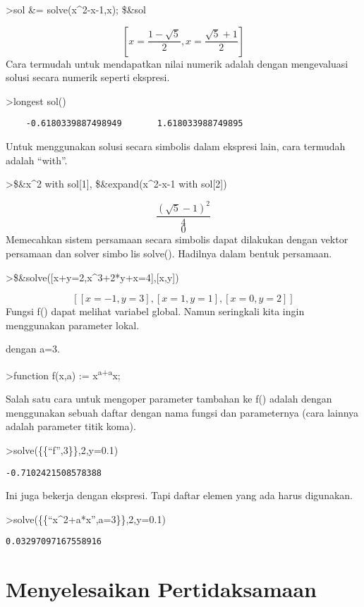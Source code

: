 \documentclass[
]{book}
\begin{document}
\textgreater sol \&= solve(x\^{}2-x-1,x); \$\&sol

\[\left[ x=\frac{1-\sqrt{5}}{2} , x=\frac{\sqrt{5}+1}{2} \right] \]Cara termudah untuk mendapatkan nilai numerik adalah dengan mengevaluasi solusi secara numerik seperti ekspresi.

\textgreater longest sol()

\begin{verbatim}
    -0.6180339887498949       1.618033988749895 
\end{verbatim}

Untuk menggunakan solusi secara simbolis dalam ekspresi lain, cara termudah adalah ``with''.

\textgreater\$\&x\^{}2 with sol{[}1{]}, \$\&expand(x\^{}2-x-1 with sol{[}2{]})

\[\frac{\left(\sqrt{5}-1\right)^2}{4}\]\[0\]Memecahkan sistem persamaan secara simbolis dapat dilakukan dengan vektor persamaan dan solver simbolis solve(). Hadilnya dalam bentuk persamaan.

\textgreater\$\&solve({[}x+y=2,x\^{}3+2*y+x=4{]},{[}x,y{]})

\[\left[ \left[ x=-1 , y=3 \right]  , \left[ x=1 , y=1 \right]  , 
 \left[ x=0 , y=2 \right]  \right] \]Fungsi f() dapat melihat variabel global. Namun seringkali kita ingin menggunakan parameter lokal.

dengan a=3.

\textgreater function f(x,a) := x\textsuperscript{a+a}x;

Salah satu cara untuk mengoper parameter tambahan ke f() adalah dengan menggunakan sebuah daftar dengan nama fungsi dan parameternya (cara lainnya adalah parameter titik koma).

\textgreater solve(\{\{``f'',3\}\},2,y=0.1)

\begin{verbatim}
-0.7102421508578388
\end{verbatim}

Ini juga bekerja dengan ekspresi. Tapi daftar elemen yang ada harus digunakan.

\textgreater solve(\{\{``x\^{}2+a*x'',a=3\}\},2,y=0.1)

\begin{verbatim}
0.03297097167558916
\end{verbatim}

\section{Menyelesaikan Pertidaksamaan}\label{menyelesaikan-pertidaksamaan}
\end{document}
